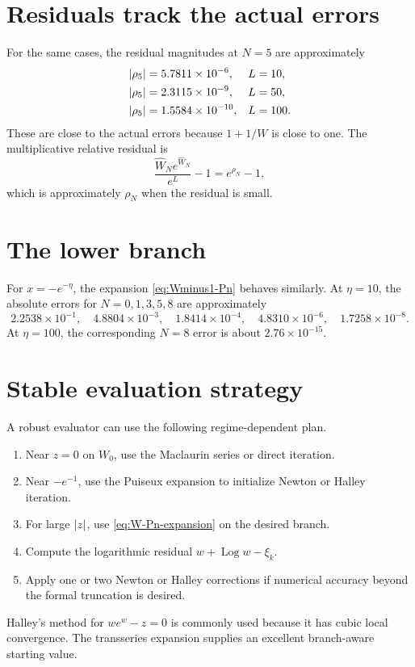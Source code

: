 \documentclass[11pt,openany]{book}
\theoremstyle{definition}
\theoremstyle{plain}
\theoremstyle{remark}
\DeclareMathOperator{\Log}{Log}
\DeclarePairedDelimiter{\abs}{\lvert}{\rvert}
\begin{document}
\section{Residuals track the actual errors}
For the same cases, the residual magnitudes at \(N=5\) are approximately
\begin{align*}
 \abs{\rho_5}&=5.7811\times10^{-6},&&L=10,\\
 \abs{\rho_5}&=2.3115\times10^{-9},&&L=50,\\
 \abs{\rho_5}&=1.5584\times10^{-10},&&L=100.
\end{align*}
These are close to the actual errors because \(1+1/W\) is close to one. The multiplicative relative residual is
\[
 \frac{\widehat W_Ne^{\widehat W_N}}{e^L}-1=e^{\rho_N}-1,
\]
which is approximately \(\rho_N\) when the residual is small.

\section{The lower branch}
For \(x=-e^{-\eta}\), the expansion \cref{eq:Wminus1-Pn} behaves similarly. At \(\eta=10\), the absolute errors for \(N=0,1,3,5,8\) are approximately
\[
 2.2538\times10^{-1},\quad
 4.8804\times10^{-3},\quad
 1.8414\times10^{-4},\quad
 4.8310\times10^{-6},\quad
 1.7258\times10^{-8}.
\]
At \(\eta=100\), the corresponding \(N=8\) error is about \(2.76\times10^{-15}\).

\section{Stable evaluation strategy}
A robust evaluator can use the following regime-dependent plan.
\begin{enumerate}
\item Near \(z=0\) on \(W_0\), use the Maclaurin series or direct iteration.
\item Near \(-e^{-1}\), use the Puiseux expansion to initialize Newton or Halley iteration.
\item For large \(\abs z\), use \cref{eq:W-Pn-expansion} on the desired branch.
\item Compute the logarithmic residual \(w+\Log w-\xi_k\).
\item Apply one or two Newton or Halley corrections if numerical accuracy beyond the formal truncation is desired.
\end{enumerate}

Halley's method for \(we^w-z=0\) is commonly used because it has cubic local convergence. The transseries expansion supplies an excellent branch-aware starting value.
\end{document}
